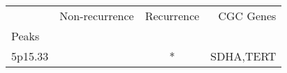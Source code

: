 \begin{tabular}{lccr}
\toprule
{} & Non-recurrence & Recurrence &  CGC Genes \\
Peaks   &                &            &            \\
\midrule
5p15.33 &                &          * &  SDHA,TERT \\
\bottomrule
\end{tabular}
